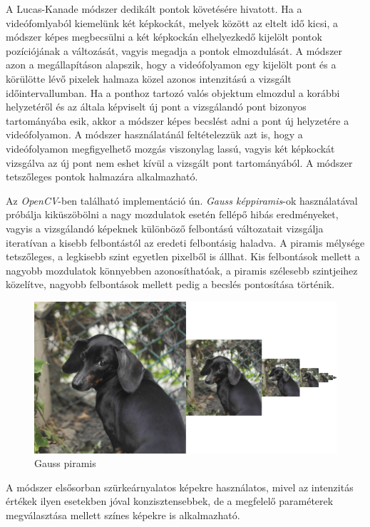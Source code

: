 A Lucas-Kanade módszer dedikált pontok követésére hivatott. Ha a videófomlyaból kiemelünk két képkockát, melyek között az eltelt idő kicsi, a módszer képes megbecsülni a két képkockán elhelyezkedő kijelölt pontok pozíciójának a változását, vagyis megadja a pontok elmozdulását. A módszer azon a megállapításon alapszik, hogy a videófolyamon egy kijelölt pont és a körülötte lévő pixelek halmaza közel azonos intenzitású a vizsgált időintervallumban. Ha a ponthoz tartozó valós objektum elmozdul a korábbi helyzetéről és az általa képviselt új pont a vizsgálandó pont bizonyos tartományába esik, akkor a módszer képes becslést adni a pont új helyzetére a videófolyamon. A módszer használatánál feltételezzük azt is, hogy a videófolyamon megfigyelhető mozgás viszonylag lassú, vagyis két képkockát vizsgálva az új pont nem eshet kívül a vizsgált pont tartományából. A módszer tetszőleges pontok halmazára alkalmazható. \cite{lucas1981iterative} 

Az \textit{OpenCV}-ben található implementáció ún. \textit{Gauss képpiramis}-ok használatával próbálja kiküszöbölni a nagy mozdulatok esetén fellépő hibás eredményeket, vagyis a vizsgálandó képeknek különböző felbontású változatait vizsgálja iteratívan a kisebb felbontástól az eredeti felbontásig haladva. A piramis mélysége tetszőleges, a legkisebb szint egyetlen pixelből is állhat. Kis felbontások mellett a nagyobb mozdulatok könnyebben azonosíthatóak, a piramis szélesebb szintjeihez közelítve, nagyobb felbontások mellett pedig a becslés pontosítása történik.

\begin{figure}[h]
\centering
\includegraphics[width=7.65truecm, height=3.84truecm]{images/gauss_pyramid.png}
\caption{Gauss piramis}
\label{fig:gausspyramid}
\end{figure}

A módszer elsősorban szürkeárnyalatos képekre használatos, mivel az intenzitás értékek ilyen esetekben jóval konzisztensebbek, de a megfelelő paraméterek megválasztása mellett színes képekre is alkalmazható. \cite{bradski2008learning} 

